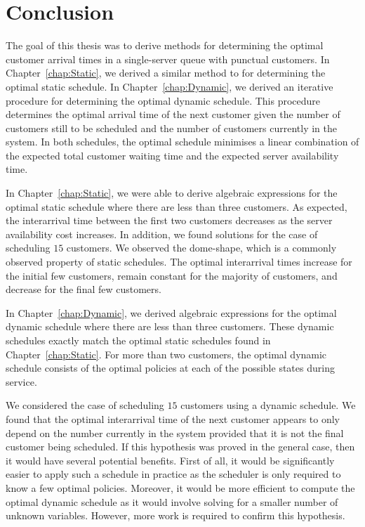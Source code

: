 \chapter{Conclusion}
The goal of this thesis was to derive methods for determining the optimal customer arrival times in a single-server queue with punctual customers. In Chapter~\ref{chap:Static}, we derived a similar method to \citet{Pegden} for determining the optimal static schedule. In Chapter~\ref{chap:Dynamic}, we derived an iterative procedure for determining the optimal dynamic schedule. This procedure determines the optimal arrival time of the next customer given the number of customers still to be scheduled and the number of customers currently in the system. In both schedules, the optimal schedule minimises a linear combination of the expected total customer waiting time and the expected server availability time.

In Chapter~\ref{chap:Static}, we were able to derive algebraic expressions for the optimal static schedule where there are less than three customers. As expected, the interarrival time between the first two customers decreases as the server availability cost increases. In addition, we found solutions for the case of scheduling $15$ customers. We observed the dome-shape, which is a commonly observed property of static schedules. The optimal interarrival times increase for the initial few customers, remain constant for the majority of customers, and decrease for the final few customers.

In Chapter~\ref{chap:Dynamic}, we derived algebraic expressions for the optimal dynamic schedule where there are less than three customers. These dynamic schedules exactly match the optimal static schedules found in Chapter~\ref{chap:Static}. For more than two customers, the optimal dynamic schedule consists of the optimal policies at each of the possible states during service.

We considered the case of scheduling $15$ customers using a dynamic schedule. We found that the optimal interarrival time of the next customer appears to only depend on the number currently in the system provided that it is not the final customer being scheduled. If this hypothesis was proved in the general case, then it would have several potential benefits. First of all, it would be significantly easier to apply such a schedule in practice as the scheduler is only required to know a few optimal policies. Moreover, it would be more efficient to compute the optimal dynamic schedule as it would involve solving for a smaller number of unknown variables. However, more work is required to confirm this hypothesis.

